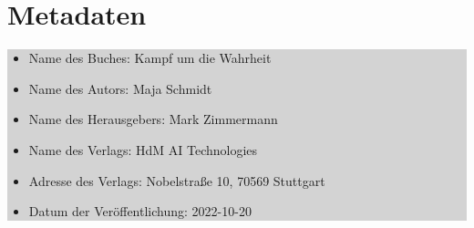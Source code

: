 \documentclass[12pt]{article} %
\begin{document}
\section*{Metadaten}
\begin{minipage}{\textwidth}
    \colorbox{lightgray}{
        \begin{minipage}{\dimexpr\textwidth-2\fboxsep}
            \vspace{4cm}
            \begin{itemize}
                \item Name des Buches: Kampf um die Wahrheit
                \item Name des Autors: Maja Schmidt
                \item Name des Herausgebers: Mark Zimmermann
                \item Name des Verlags: HdM AI Technologies
                \item Adresse des Verlags: Nobelstraße 10, 70569 Stuttgart
                \item Datum der Veröffentlichung: 2022-10-20
            \end{itemize}
            \vspace{4cm}
        \end{minipage}

    }
\end{minipage}
\end{document}

